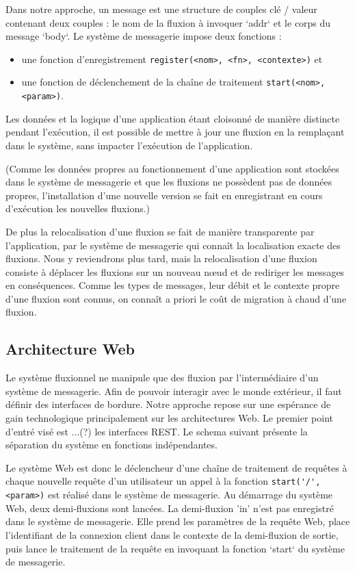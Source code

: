		Dans notre approche, un message est une structure de couples clé / valeur  contenant deux couples : le nom de la fluxion à invoquer `addr` et le corps du message `body`.
		Le système de messagerie impose deux fonctions :
		\begin{itemize}
			\item une fonction d'enregistrement
		    \lstinline|register(<nom>, <fn>, <contexte>)| et
			\item une fonction de déclenchement de la chaîne de traitement
		    \lstinline|start(<nom>,<param>)|.
		\end{itemize}


		Les données et la logique d'une application étant cloisonné de manière distincte pendant l'exécution, il est possible de mettre à jour une fluxion en la remplaçant dans le système, sans impacter l'exécution de l'application.

		(Comme les données propres au fonctionnement d'une application sont stockées dans le système de messagerie et que les fluxions ne possèdent pas de données propres, l'installation d'une nouvelle version se fait en enregistrant en cours d'exécution les nouvelles fluxions.)

		De plus la relocalisation d'une fluxion se fait de manière transparente par l'application, par le système de messagerie qui connaît la localisation exacte des fluxions. Nous y reviendrons plus tard, mais la relocalisation d'une fluxion consiste à déplacer les fluxions sur un nouveau nœud et de rediriger les messages en conséquences. Comme les types de messages, leur débit et le contexte propre d'une fluxion sont connus, on connaît a priori le coût de migration à chaud d'une fluxion.

	\subsection{Architecture Web}

		Le système fluxionnel ne manipule que des fluxion par l'intermédiaire d'un système de messagerie. Afin de pouvoir interagir avec le monde extérieur, il faut définir des interfaces de bordure. Notre approche repose sur une espérance de gain technologique principalement sur les architectures Web. Le premier point d'entré visé est ...(?) les interfaces REST.
		Le schema suivant présente la séparation du système en fonctions indépendantes.


		Le système Web est donc le déclencheur d'une chaîne de traitement de requêtes à chaque nouvelle requête d'un utilisateur un appel à la fonction \lstinline|start('/', <param>)| est réalisé dans le système de messagerie.
		Au démarrage du système Web, deux demi-fluxions sont lancées.
		La demi-fluxion 'in' n'est pas enregistré dans le système de messagerie.
		Elle prend les paramètres de la requête Web, place l'identifiant de la connexion client dans le contexte de la demi-fluxion de sortie, puis lance le traitement de la requête en invoquant la fonction `start` du système de messagerie.


